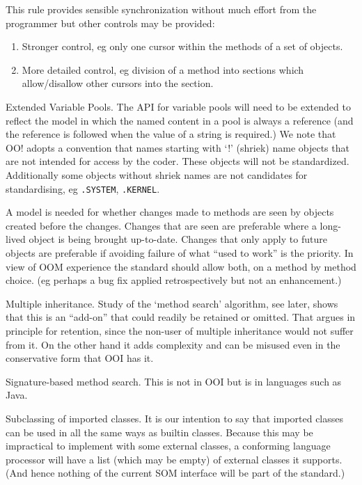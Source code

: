This rule provides sensible synchronization without much effort from the
programmer but other controls may be provided:

\begin{enumerate}
\def\labelenumi{\alph{enumi})}
\item
  Stronger control, eg only one cursor within the methods of a set of
  objects.
\item
  More detailed control, eg division of a method into sections which
  allow/disallow other cursors into the section.
\end{enumerate}

Extended Variable Pools. The API for variable pools will need to be
extended to reflect the model in which the named content in a pool is
always a reference (and the reference is followed when the value of a
string is required.) We note that OO! adopts a convention that names
starting with `!' (shriek) name objects that are not intended for access
by the coder. These objects will not be standardized. Additionally some
objects without shriek names are not candidates for standardising, eg
\texttt{.SYSTEM}, \texttt{.KERNEL}.

A model is needed for whether changes made to methods are seen by
objects created before the changes. Changes that are seen are preferable
where a long-lived object is being brought up-to-date. Changes that only
apply to future objects are preferable if avoiding failure of what
``used to work'' is the priority. In view of OOM experience the standard
should allow both, on a method by method choice. (eg perhaps a bug fix
applied retrospectively but not an enhancement.)

Multiple inheritance. Study of the `method search' algorithm, see later,
shows that this is an ``add-on'' that could readily be retained or
omitted. That argues in principle for retention, since the non-user of
multiple inheritance would not suffer from it. On the other hand it adds
complexity and can be misused even in the conservative form that OOI has
it.

Signature-based method search. This is not in OOI but is in languages
such as Java.

Subclassing of imported classes. It is our intention to say that
imported classes can be used in all the same ways as builtin classes.
Because this may be impractical to implement with some external classes,
a conforming language processor will have a list (which may be empty) of
external classes it supports. (And hence nothing of the current SOM
interface will be part of the standard.)

